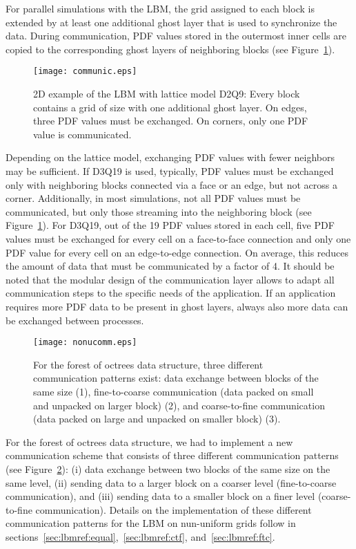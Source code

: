 \documentclass[final,leqno,onefignum,onetabnum]{siamltex1213}
\begin{document}
For parallel simulations with the LBM,
the grid assigned to each block is extended by at least one additional ghost layer that is used to synchronize the data.
During communication, PDF values stored in the outermost inner cells are copied to the corresponding ghost layers of neighboring blocks (see Figure~\ref{fig:communication}).

\begin{figure}[tbp]
  \centering
  \texttt{[image: communic.eps]}
  \caption{2D example of the LBM with lattice model D2Q9: Every block contains a grid of size  with one additional ghost layer.
On edges, three PDF values must be exchanged. On corners, only one PDF value is communicated.}
  \label{fig:communication}
\end{figure}

Depending on the lattice model, exchanging PDF values with fewer neighbors may be sufficient.
If D3Q19 is used, typically, PDF values must be exchanged only with neighboring blocks connected via a face or an edge, but not across a corner.
Additionally, in most simulations, not all PDF values must be communicated, but only those streaming into the neighboring block (see Figure~\ref{fig:communication}).
For D3Q19, out of the 19 PDF values stored in each cell, five PDF values must be exchanged for every cell on a face-to-face connection and only one PDF value for every cell on an edge-to-edge connection.
On average, this reduces the amount of data that must be communicated by a factor of 4.
It should be noted that the modular design of the communication layer allows to adapt all communication steps to the specific needs of the application.
If an application requires more PDF data to be present in ghost layers, always also more data can be exchanged between processes.

\begin{figure}[tbp]
  \centering
  \texttt{[image: nonucomm.eps]}
  \caption{For the forest of octrees data structure, three different communication patterns exist:
data exchange between blocks of the same size (1), fine-to-coarse communication (data packed on small and unpacked on larger block) (2),
and coarse-to-fine communication (data packed on large and unpacked on smaller block) (3).}
  \label{fig:nonuniform_communication}
\end{figure}

For the forest of octrees data structure, we had to implement a new communication scheme that consists of
three different communication patterns (see Figure~\ref{fig:nonuniform_communication}):
(i) data exchange between two blocks of the same size on the same level,
(ii) sending data to a larger block on a coarser level (fine-to-coarse communication),
and (iii) sending data to a smaller block on a finer level (coarse-to-fine communication).
Details on the implementation of these different communication patterns for the LBM on nun-uniform grids follow in sections~\ref{sec:lbmref:equal},~\ref{sec:lbmref:ctf}, and~\ref{sec:lbmref:ftc}.
\end{document}
